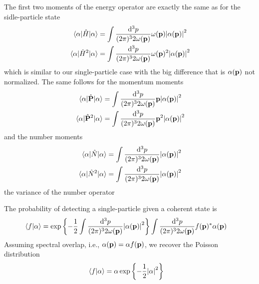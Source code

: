 The first two moments of the energy operator are exactly the same as for the sidle-particle state
\begin{align}
	\expval{\hat{H}}{\alpha}
	&=
	\int\frac{\dd[3]{p}}{(2\pi)^32\omega(\vb{p})}
	\omega(\vb{p})
	\abs{\alpha(\vb{p})}^2
	\\
	\expval{\hat{H}^2}{\alpha}
	&=
	\int\frac{\dd[3]{p}}{(2\pi)^32\omega(\vb{p})}
	\omega(\vb{p})^2
	\abs{\alpha(\vb{p})}^2
\end{align}
which is similar to our single-particle case with the big difference that is $\alpha(\vb{p})$ not normalized.
The same follows for the momentum moments
\begin{align}
	\expval{\hat{\vb{P}}}{\alpha}
	&=
	\int\frac{\dd[3]{p}}{(2\pi)^32\omega(\vb{p})}
	\vb{p}
	\abs{\alpha(\vb{p})}^2
	\\
	\expval{\hat{\vb{P}}^2}{\alpha}
	&=
	\int\frac{\dd[3]{p}}{(2\pi)^32\omega(\vb{p})}
	\vb{p}^2
	\abs{\alpha(\vb{p})}^2
\end{align}
and the number moments
\begin{align}
	\expval{\hat{N}}{\alpha}
	&=
	\int\frac{\dd[3]{p}}{(2\pi)^32\omega(\vb{p})}
	\abs{\alpha(\vb{p})}^2
	\\
	\expval{\hat{N}^2}{\alpha}
	&=
	\int\frac{\dd[3]{p}}{(2\pi)^32\omega(\vb{p})}
	\abs{\alpha(\vb{p})}^2
\end{align}
the variance of the number operator

The probability of detecting a single-particle given a coherent state is
\begin{equation}
	\begin{split}
		\braket{f}{\alpha}
		&=
		\exp\left\{
			-
			\frac{1}{2}
			\int\frac{\dd[3]{p}}{(2\pi)^32\omega(\vb{p})}
			\abs{\alpha(\vb{p})}^2
		\right\}
		\int\frac{\dd[3]{p}}{(2\pi)^32\omega(\vb{p})}
		f(\vb{p})^*
		\alpha(\vb{p})
	\end{split}
\end{equation}
Assuming spectral overlap, i.e., $\alpha(\vb{p})=\alpha f(\vb{p})$, we recover the Poisson distribution
\begin{equation}
	\begin{split}
		\braket{f}{\alpha}
		&=
		\alpha
		\exp\left\{
			-
			\frac{1}{2}
			\abs{\alpha}^2
		\right\}
	\end{split}
\end{equation}
